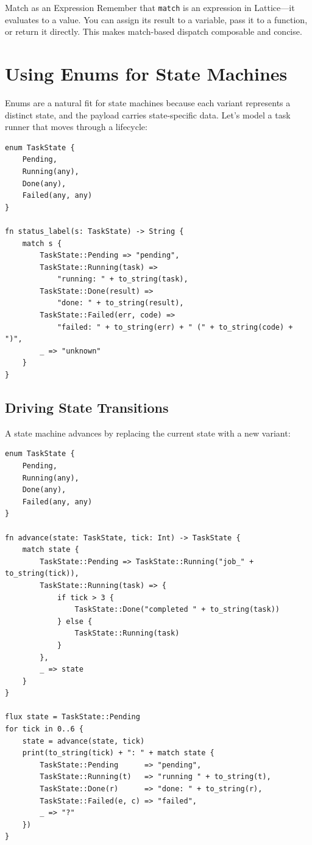 \begin{tipbox}{Match as an Expression}
Remember that \lstinline|match| is an expression in Lattice---it evaluates
to a value. You can assign its result to a variable, pass it to a function,
or return it directly. This makes match-based dispatch composable and
concise.
\end{tipbox}

\section{Using Enums for State Machines}\label{sec:enum-state-machines}

Enums are a natural fit for state machines because each variant represents
a distinct state, and the payload carries state-specific data. Let's model
a task runner that moves through a lifecycle:

\begin{lstlisting}[language=Lattice, caption={A task lifecycle as an enum}]
enum TaskState {
    Pending,
    Running(any),
    Done(any),
    Failed(any, any)
}

fn status_label(s: TaskState) -> String {
    match s {
        TaskState::Pending => "pending",
        TaskState::Running(task) =>
            "running: " + to_string(task),
        TaskState::Done(result) =>
            "done: " + to_string(result),
        TaskState::Failed(err, code) =>
            "failed: " + to_string(err) + " (" + to_string(code) + ")",
        _ => "unknown"
    }
}
\end{lstlisting}

\subsection{Driving State Transitions}

A state machine advances by replacing the current state with a new variant:

\begin{lstlisting}[language=Lattice, caption={State transitions}]
enum TaskState {
    Pending,
    Running(any),
    Done(any),
    Failed(any, any)
}

fn advance(state: TaskState, tick: Int) -> TaskState {
    match state {
        TaskState::Pending => TaskState::Running("job_" + to_string(tick)),
        TaskState::Running(task) => {
            if tick > 3 {
                TaskState::Done("completed " + to_string(task))
            } else {
                TaskState::Running(task)
            }
        },
        _ => state
    }
}

flux state = TaskState::Pending
for tick in 0..6 {
    state = advance(state, tick)
    print(to_string(tick) + ": " + match state {
        TaskState::Pending      => "pending",
        TaskState::Running(t)   => "running " + to_string(t),
        TaskState::Done(r)      => "done: " + to_string(r),
        TaskState::Failed(e, c) => "failed",
        _ => "?"
    })
}
\end{lstlisting}

